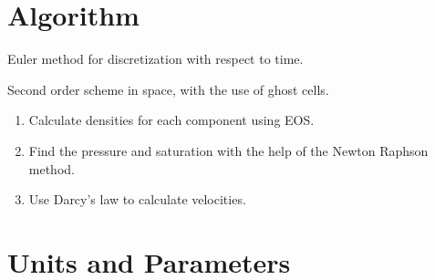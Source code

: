 \documentclass[a4paper,12pt]{article}
\begin{document}
% 
% 
% 
\section{Algorithm}

Euler method for discretization with respect to time.

Second order scheme in space, with the use of ghost cells. 

\begin{enumerate}
    \item Calculate densities for each component using EOS.
    \item Find the pressure and saturation with the
        help of the Newton Raphson method.
    \item Use Darcy's law to calculate velocities.
\end{enumerate}

\section{Units and Parameters}
\end{document}
